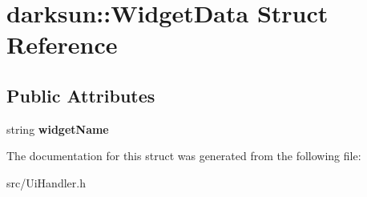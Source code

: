 \hypertarget{structdarksun_1_1_widget_data}{}\section{darksun\+::Widget\+Data Struct Reference}
\label{structdarksun_1_1_widget_data}
\subsection*{Public Attributes}
\begin{DoxyCompactItemize}
\item 
\mbox{\label{structdarksun_1_1_widget_data_a683602570d35297e5a141046b676d602}} 
string {\bfseries widget\+Name}
\end{DoxyCompactItemize}


The documentation for this struct was generated from the following file\+:\begin{DoxyCompactItemize}
\item 
src/Ui\+Handler.\+h\end{DoxyCompactItemize}

